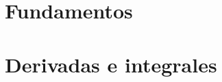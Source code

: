 \documentclass[10pt]{book}
\begin{document}



\part{Fundamentos}









\part{Derivadas e integrales}

\end{document}
